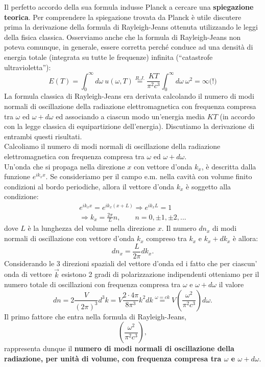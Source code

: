 \documentclass[a4paper,12pt,oneside]{book}
\begin{document}
Il perfetto accordo della sua formula indusse Planck a cercare una \textbf{spiegazione teorica}. Per comprendere la spiegazione trovata da Planck è utile discutere prima la derivazione della formula di Rayleigh-Jeans ottenuta utilizzando le leggi della fisica classica. Osserviamo anche che la formula di  Rayleigh-Jeans non poteva comunque, in generale, essere corretta perché conduce ad una densità di energia totale (integrata su tutte le frequenze) infinita (``catastrofe ultravioletta''):
	\begin{equation}
		E(T) = \int _0 ^\infty d\omega\ u(\omega , T) \overset{R.J.}{=} \frac{KT}{\pi ^2 c ^3}\int _0 ^\infty d\omega \ \omega ^2 = \infty \textrm{(!)}
	\end{equation}
La formula classica di Rayleigh-Jeans era derivata calcolando il numero di modi normali di oscillazione della radiazione elettromagnetica con frequenza compresa tra $\omega$ ed $\omega + d\omega$ ed associando a ciascun modo un'energia media $KT$ (in accordo con la legge classica di equipartizione dell'energia). Discutiamo la derivazione di entrambi questi risultati.\\
Calcoliamo il numero di modi normali di oscillazione della radiazione elettromagnetica con frequenza compresa tra $\omega$ ed $\omega + d\omega$. \\
Un'onda che si propaga nella direzione $x$ con vettore d'onda $k_x$, è descritta dalla funzione $e^{ik_x x}$. Se consideriamo per il campo e.m. nella cavità con volume finito condizioni al bordo periodiche, allora il vettore d'onda $k_x$ è soggetto alla condizione:
	\begin{eqnarray}
		e^{ik_x x}= e^{ik_x (x+L)} \Rightarrow e^{ik_x L}=1  \nonumber\\ \Rightarrow k_x=\frac{2\pi}{L}n, \qquad n= 0, \pm 1, \pm 2,...
	\end{eqnarray}
dove $L$ è la lunghezza del volume nella direzione $x$. Il numero $dn_x$ di modi normali di oscillazione con vettore d'onda $k_x$ compreso tra $k_x$ e $k_x+dk_x$ è allora:
	\begin{equation}
		dn_x =\frac{L}{2\pi}dk_x.
	\end{equation}
Considerando le 3 direzioni spaziali del vettore d'onda ed i fatto che per ciascun' onda di vettore $\vec{k}$ esistono 2 gradi di polarizzazione indipendenti otteniamo per il numero totale di oscillazioni con frequenza compresa tra $\omega$ e $\omega + d\omega$ il valore
	\begin{equation}
		dn =2\frac{V}{(2\pi)^3}d^3k= V \frac{2\cdot 4\pi}{8\pi ^3} k^2 dk \overset{\omega =ck}{=} V \left( \frac{\omega ^2}{\pi ^2 c^3}\right) d\omega .
	\end{equation}
Il primo fattore che entra nella formula di Rayleigh-Jeans,
	\begin{equation}
		\boxed{
			\left( \frac{\omega ^2}{\pi ^2 c^3} \right) ,
		}
		\label{eq:cap1_1}
	\end{equation}
rappresenta dunque il \textbf{numero di modi normali di oscillazione della radiazione, per unità di volume, con frequenza compresa tra $\omega$ e $\omega + d\omega$}.\\
\end{document}
